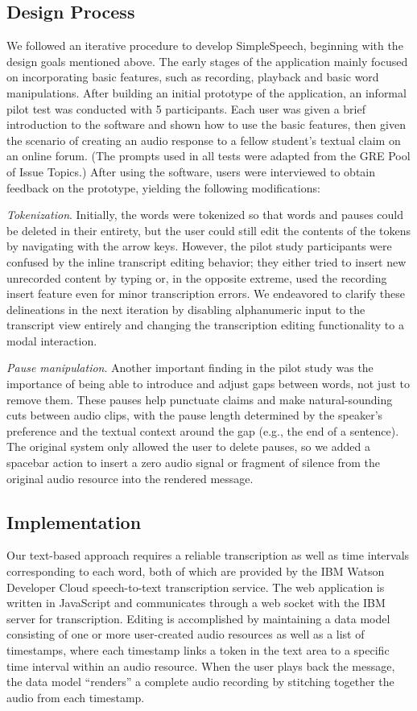 \subsection{Design Process}
We followed an iterative procedure to develop SimpleSpeech, beginning with the design goals mentioned above.
The early stages of the application mainly focused on incorporating basic features, such as recording, playback and basic word manipulations. 
After building an initial prototype of the application, an informal pilot test was conducted with 5 participants. 
Each user was given a brief introduction to the software and shown how to use the basic features, then given the scenario of creating an audio response to a fellow student's textual claim on an online forum. 
(The prompts used in all tests were adapted from the GRE Pool of Issue Topics.) 
After using the software, users were interviewed to obtain feedback on the prototype, yielding the following modifications:

\emph{Tokenization}. 
Initially, the words were tokenized so that words and pauses could be deleted in their entirety, but the user could still edit the contents of the tokens by navigating with the arrow keys.
However, the pilot study participants were confused by the inline transcript editing behavior; they either tried to insert new unrecorded content by typing or, in the opposite extreme, used the recording insert feature even for minor transcription errors. 
We endeavored to clarify these delineations in the next iteration by disabling alphanumeric input to the transcript view entirely and changing the transcription editing functionality to a modal interaction.

\emph{Pause manipulation}.
Another important finding in the pilot study was the importance of being able to introduce and adjust gaps between words, not just to remove them. 
These pauses help punctuate claims and make natural-sounding cuts between audio clips, with the pause length determined by the speaker's preference and the textual context around the gap (e.g., the end of a sentence). 
The original system only allowed the user to delete pauses, so we added a spacebar action to insert a zero audio signal or fragment of silence from the original audio resource into the rendered message. 

\subsection{Implementation}
Our text-based approach requires a reliable transcription as well as time intervals corresponding to each word, both of which are provided by the IBM Watson Developer Cloud speech-to-text transcription service.
The web application is written in JavaScript and communicates through a web socket with the IBM server for transcription.
Editing is accomplished by maintaining a data model consisting of one or more user-created audio resources as well as a list of timestamps, where each timestamp links a token in the text area to a specific time interval within an audio resource. 
When the user plays back the message, the data model ``renders'' a complete audio recording by stitching together the audio from each timestamp. 
